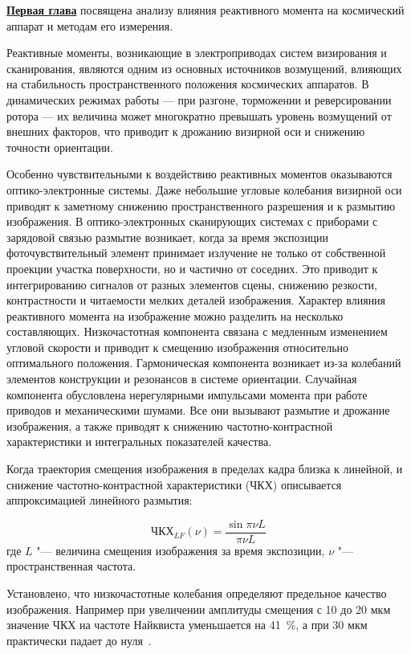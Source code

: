 \underline{\textbf{Первая глава}} посвящена анализу влияния реактивного момента на космический аппарат и методам его измерения.

Реактивные моменты, возникающие в электроприводах систем визирования и сканирования, являются одним из основных источников возмущений, влияющих на стабильность пространственного положения космических аппаратов. В динамических режимах работы — при разгоне, торможении и реверсировании ротора — их величина может многократно превышать уровень возмущений от внешних факторов, что приводит к дрожанию визирной оси и снижению точности ориентации.

Особенно чувствительными к воздействию реактивных моментов оказываются оптико-электронные системы. Даже небольшие угловые колебания визирной оси приводят к заметному снижению пространственного разрешения и к размытию изображения. В оптико-электронных сканирующих системах с приборами с зарядовой связью размытие возникает, когда за время экспозиции фоточувствительный элемент принимает излучение не только от собственной проекции участка поверхности, но и частично от соседних. Это приводит к интегрированию сигналов от разных элементов сцены, снижению резкости, контрастности и читаемости мелких деталей изображения. Характер влияния реактивного момента на изображение можно разделить на несколько составляющих. Низкочастотная компонента связана с медленным изменением угловой скорости и приводит к смещению изображения относительно оптимального положения. Гармоническая компонента возникает из-за колебаний элементов конструкции и резонансов в системе ориентации. Случайная компонента обусловлена нерегулярными импульсами момента при работе приводов и механическими шумами. Все они вызывают размытие и дрожание изображения, а также приводят к снижению частотно-контрастной характеристики и интегральных показателей качества.

Когда траектория смещения изображения в пределах кадра близка к линейной, и снижение частотно-контрастной характеристики (ЧКХ) описывается аппроксимацией
линейного размытия:
\begin{samepage}
	\begin{equation*}
		\label{mtf_lf}
		\text{ЧКХ}_{LF}(\nu)=\frac{\sin{\pi \nu L}}{\pi \nu L}
	\end{equation*}
	где \(L\) "--- величина смещения изображения за время экспозиции, \(\nu\) "--- пространственная частота.
\end{samepage}


Установлено, что низкочастотные колебания определяют предельное качество изображения. Например при увеличении амплитуды смещения с 10 до 20 мкм значение ЧКХ на частоте Найквиста уменьшается на 41~\%, а при 30 мкм практически падает до нуля~\cite{wahballah2018smear}.


